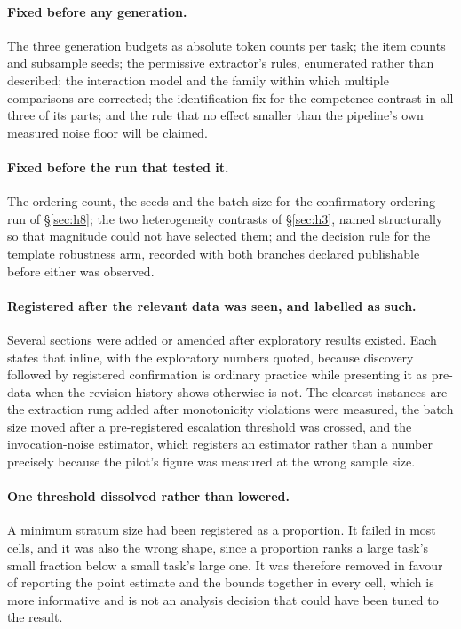 \documentclass[11pt]{article}
\begin{document}
\paragraph{Fixed before any generation.} The three generation budgets as absolute token
counts per task; the item counts and subsample seeds; the permissive extractor's rules,
enumerated rather than described; the interaction model and the family within which
multiple comparisons are corrected; the identification fix for the competence contrast in
all three of its parts; and the rule that no effect smaller than the pipeline's own
measured noise floor will be claimed.

\paragraph{Fixed before the run that tested it.} The ordering count, the seeds and the
batch size for the confirmatory ordering run of \S\ref{sec:h8}; the two heterogeneity
contrasts of \S\ref{sec:h3}, named structurally so that magnitude could not have selected
them; and the decision rule for the template robustness arm, recorded with both branches
declared publishable before either was observed.

\paragraph{Registered after the relevant data was seen, and labelled as such.}
Several sections were added or amended after exploratory results existed. Each states
that inline, with the exploratory numbers quoted, because discovery followed by registered
confirmation is ordinary practice while presenting it as pre-data when the revision
history shows otherwise is not. The clearest instances are the extraction rung added after
monotonicity violations were measured, the batch size moved after a pre-registered
escalation threshold was crossed, and the invocation-noise estimator, which registers an
estimator rather than a number precisely because the pilot's figure was measured at the
wrong sample size.

\paragraph{One threshold dissolved rather than lowered.} A minimum stratum size had been
registered as a proportion. It failed in most cells, and it was also the wrong shape,
since a proportion ranks a large task's small fraction below a small task's large one. It
was therefore removed in favour of reporting the point estimate and the bounds together in
every cell, which is more informative and is not an analysis decision that could have been
tuned to the result.

\end{document}
